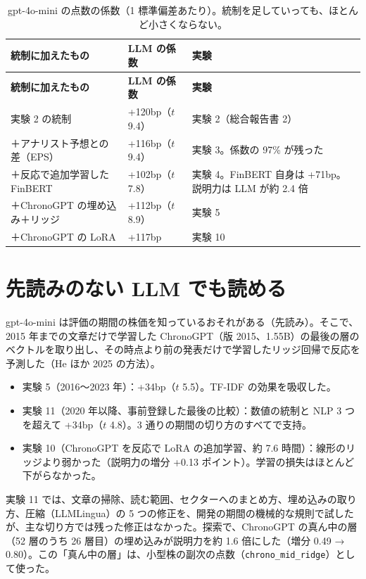 \documentclass[xelatex,ja=standard,jafont=haranoaji,a4paper,10pt]{bxjsreport}
\newcommand{\code}[1]{\texttt{#1}}
\begin{document}
\begin{longtable}{p{6.2cm}p{2.6cm}p{5.0cm}}
\caption{gpt-4o-mini の点数の係数（1 標準偏差あたり）。統制を足していっても、ほとんど小さくならない。}\label{tab:controls}\\
\toprule
\textbf{統制に加えたもの} & \textbf{LLM の係数} & \textbf{実験} \\
\midrule
\endfirsthead
\toprule
\textbf{統制に加えたもの} & \textbf{LLM の係数} & \textbf{実験} \\
\midrule
\endhead
\bottomrule
\endfoot
実験 2 の統制 & +120bp（$t$ 9.4） & 実験 2（総合報告書 2） \\
＋アナリスト予想との差（EPS） & +116bp（$t$ 9.4） & 実験 3。係数の 97\% が残った \\
＋反応で追加学習した FinBERT & +102bp（$t$ 7.8） & 実験 4。FinBERT 自身は +71bp。説明力は LLM が約 2.4 倍 \\
＋ChronoGPT の埋め込み＋リッジ & +112bp（$t$ 8.9） & 実験 5 \\
＋ChronoGPT の LoRA & +117bp & 実験 10 \\
\end{longtable}

\section{先読みのない LLM でも読める}

gpt-4o-mini は評価の期間の株価を知っているおそれがある（先読み）。そこで、2015 年までの文章だけで学習した ChronoGPT（版 2015、1.55B）の最後の層のベクトルを取り出し、その時点より前の発表だけで学習したリッジ回帰で反応を予測した（He ほか 2025 の方法）。

\begin{itemize}
\item 実験 5（2016〜2023 年）：+34bp（$t$ 5.5）。TF-IDF の効果を吸収した。
\item 実験 11（2020 年以降、事前登録した最後の比較）：数値の統制と NLP 3 つを超えて +34bp（$t$ 4.8）。3 通りの期間の切り方のすべてで支持。
\item 実験 10（ChronoGPT を反応で LoRA の追加学習、約 7.6 時間）：線形のリッジより弱かった（説明力の増分 +0.13 ポイント）。学習の損失はほとんど下がらなかった。
\end{itemize}

実験 11 では、文章の掃除、読む範囲、セクターへのまとめ方、埋め込みの取り方、圧縮（LLMLingua）の 5 つの修正を、開発の期間の機械的な規則で試したが、主な切り方では残った修正はなかった。探索で、ChronoGPT の真ん中の層（52 層のうち 26 層目）の埋め込みが説明力を約 1.6 倍にした（増分 0.49 → 0.80）。この「真ん中の層」は、小型株の副次の点数（\code{chrono\_mid\_ridge}）として使った。
\end{document}
